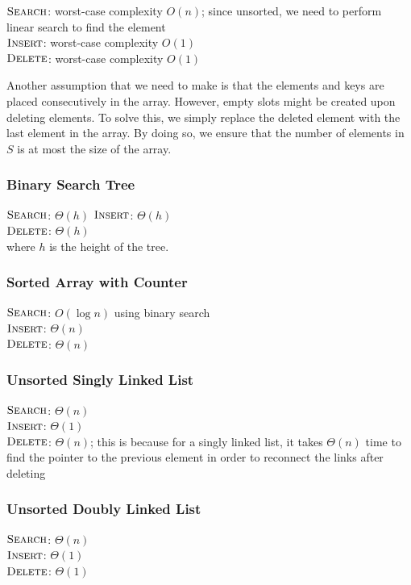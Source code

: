 $\textsc{Search}$: worst-case complexity $O(n)$; since unsorted, we need to perform linear search to find the element \\
$\textsc{Insert}$: worst-case complexity $O(1)$ \\
$\textsc{Delete}$: worst-case complexity $O(1)$

Another assumption that we need to make is that the elements and keys are placed consecutively in the array. However, empty slots might be created upon deleting elements. To solve this, we simply replace the deleted element with the last element in the array. By doing so, we ensure that the number of elements in $S$ is at most the size of the array.

\subsubsection{Binary Search Tree}

$\textsc{Search}$: $\Theta(h)$
$\textsc{Insert}$: $\Theta(h)$ \\
$\textsc{Delete}$: $\Theta(h)$ \\
where $h$ is the height of the tree.

\subsubsection{Sorted Array with Counter}

$\textsc{Search}$: $O(\log n)$ using binary search \\
$\textsc{Insert}$: $\Theta(n)$ \\
$\textsc{Delete}$: $\Theta(n)$

\subsubsection{Unsorted Singly Linked List}

$\textsc{Search}$: $\Theta(n)$ \\
$\textsc{Insert}$: $\Theta(1)$ \\
$\textsc{Delete}$: $\Theta(n)$; this is because for a singly linked list, it takes $\Theta(n)$ time to find the pointer to the previous element in order to reconnect the links after deleting

\subsubsection{Unsorted Doubly Linked List}

$\textsc{Search}$: $\Theta(n)$ \\
$\textsc{Insert}$: $\Theta(1)$ \\
$\textsc{Delete}$: $\Theta(1)$

